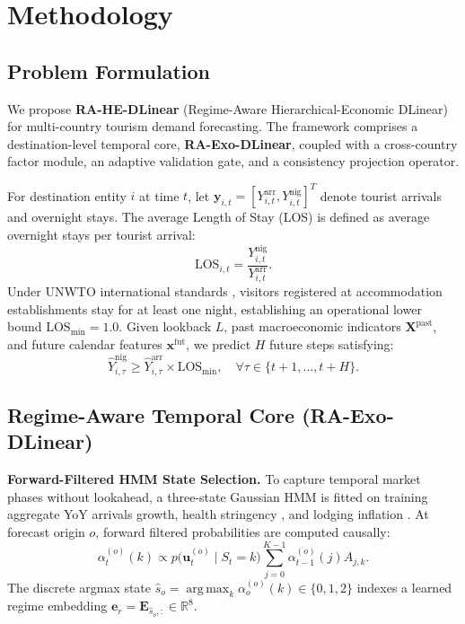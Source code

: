 \documentclass[sigconf]{acmart}
\begin{document}
\section{Methodology}
\label{sec:methodology}

\subsection{Problem Formulation}
We propose \textbf{RA-HE-DLinear} (Regime-Aware Hierarchical-Economic DLinear) for multi-country tourism demand forecasting. The framework comprises a destination-level temporal core, \textbf{RA-Exo-DLinear}, coupled with a cross-country factor module, an adaptive validation gate, and a consistency projection operator.

For destination entity $i$ at time $t$, let $\mathbf{y}_{i,t}=[Y^{\text{arr}}_{i,t},Y^{\text{nig}}_{i,t}]^T$ denote tourist arrivals and overnight stays. The average Length of Stay (LOS) is defined as average overnight stays per tourist arrival:
\begin{equation}
\text{LOS}_{i,t} = \frac{Y^{\text{nig}}_{i,t}}{Y^{\text{arr}}_{i,t}}.
\label{eq:los_definition}
\end{equation}
Under UNWTO international standards \cite{unwto2010recommendations}, visitors registered at accommodation establishments stay for at least one night, establishing an operational lower bound $\text{LOS}_{\min}=1.0$. Given lookback $L$, past macroeconomic indicators $\mathbf{X}^{\text{past}}$, and future calendar features $\mathbf{x}^{\text{fut}}$, we predict $H$ future steps satisfying:
\begin{equation}
\hat{Y}_{i, \tau}^{\text{nig}} \ge \hat{Y}_{i, \tau}^{\text{arr}} \times \text{LOS}_{\min}, \quad \forall \tau \in \{t+1, \dots, t+H\}.
\label{eq:physical_floor}
\end{equation}

\subsection{Regime-Aware Temporal Core (RA-Exo-DLinear)}
\textbf{Forward-Filtered HMM State Selection.} To capture temporal market phases without lookahead, a three-state Gaussian HMM is fitted on training aggregate YoY arrivals growth, health stringency \cite{hale2021oxford}, and lodging inflation \cite{eurostat_hicp_release}. At forecast origin $o$, forward filtered probabilities are computed causally:
\begin{equation}
\alpha_t^{(o)}(k) \propto p\big(\mathbf{u}_t^{(o)} \mid S_t=k\big) \sum_{j=0}^{K-1}\alpha_{t-1}^{(o)}(j)A_{j,k}.
\label{eq:hmm_forward}
\end{equation}
The discrete argmax state $\hat{s}_o = \operatorname*{arg\,max}_{k} \alpha_o^{(o)}(k) \in \{0,1,2\}$ indexes a learned regime embedding $\mathbf{e}_r = \mathbf{E}_{\hat{s}_o,:} \in \mathbb{R}^{8}$.
\end{document}
